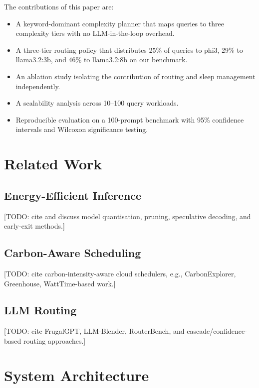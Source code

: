 \documentclass[conference]{IEEEtran}
\begin{document}
The contributions of this paper are:
\begin{itemize}
  \item A keyword-dominant complexity planner that maps queries to three
        complexity tiers with no LLM-in-the-loop overhead.
  \item A three-tier routing policy that distributes 25\% of queries to
        phi3, 29\% to llama3.2:3b, and 46\% to llama3.2:8b on our benchmark.
  \item An ablation study isolating the contribution of routing and sleep
        management independently.
  \item A scalability analysis across 10--100 query workloads.
  \item Reproducible evaluation on a 100-prompt benchmark with 95\% confidence
        intervals and Wilcoxon significance testing.
\end{itemize}

\section{Related Work}

\subsection{Energy-Efficient Inference}
[TODO: cite and discuss model quantisation, pruning, speculative decoding,
and early-exit methods.]

\subsection{Carbon-Aware Scheduling}
[TODO: cite carbon-intensity-aware cloud schedulers, e.g., CarbonExplorer,
Greenhouse, WattTime-based work.]

\subsection{LLM Routing}
[TODO: cite FrugalGPT, LLM-Blender, RouterBench, and cascade/confidence-based
routing approaches.]

\section{System Architecture}
\end{document}
